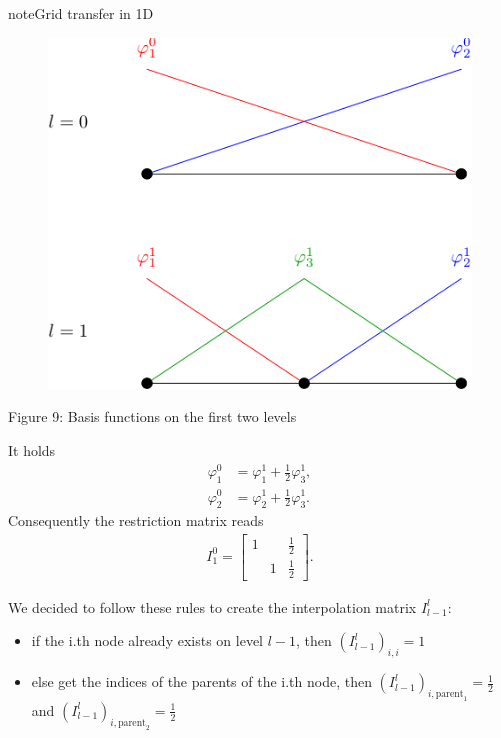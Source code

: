 \documentclass[letterpaper,10pt,english, openany]{sphinxmanual}
\begin{document}
\begin{sphinxadmonition}{note}{Grid transfer in 1D}

\begin{figure}[H]
\centering
\includegraphics[width=0.35\columnwidth]
{grid_transfer.png}
\end{figure}

\begin{center}Figure 9: Basis functions on the first two levels
\end{center}
It holds
\begin{equation*}
\begin{split}\varphi_1^0 &= \varphi_1^1 + \frac{1}{2}\varphi_3^1, \\
\varphi_2^0 &= \varphi_2^1 + \frac{1}{2}\varphi_3^1.\end{split}
\end{equation*}
Consequently the restriction matrix reads
\begin{equation*}
\begin{split}I_1^0 =
\begin{bmatrix}
1 & & \frac{1}{2} \\
& 1 & \frac{1}{2}
\end{bmatrix}.\end{split}
\end{equation*}\end{sphinxadmonition}

We decided to follow these rules to create the interpolation matrix \(I_{l-1}^l\):
\begin{itemize}
\item {} 
if the i.th node already exists on level \({l-1}\), then \(\left(I_{l-1}^l\right)_{i,i} = 1\)

\item {} 
else get the indices of the parents of the i.th node, then \(\left(I_{l-1}^l\right)_{i,\text{parent}_1} = \frac{1}{2}\) and \(\left(I_{l-1}^l\right)_{i,\text{parent}_2} = \frac{1}{2}\)

\end{itemize}
\end{document}
